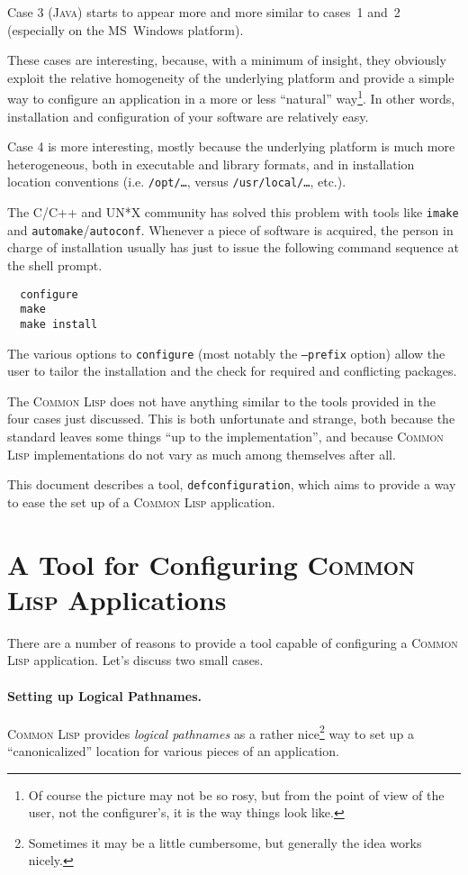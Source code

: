 \documentclass[a4paper]{article}
\newcommand{\CL}{\textsc{Common Lisp}}
\newcommand{\Java}{\textsc{Java}}
\newcommand{\defconfiguration}{\texttt{defconfiguration}}
\newcommand{\code}[1]{\texttt{#1}}
\begin{document}
Case 3 (\Java{}) starts to appear more and more similar to cases~1
and~2 (especially on the MS~Windows platform).

These cases are interesting, because, with a minimum of insight, they
obviously exploit the relative homogeneity of the underlying platform
and provide a simple way to configure an application in a more or
less ``natural'' way\footnote{Of course the picture may not be so
rosy, but from the point of view of the user, not the configurer's, it
is the way things look like.}. In other words, installation and
configuration of your software are relatively easy.

Case 4 is more interesting, mostly because the underlying platform is
much more heterogeneous, both in executable and library formats, and
in installation location conventions (i.e. \texttt{/opt/\ldots},
versus \texttt{/usr/local/\ldots}, etc.).

The C/C++ and UN*X community has solved this problem with tools like
\texttt{imake} and \texttt{automake}/\texttt{autoconf}.  Whenever a
piece of software is acquired, the person in charge of installation
usually has just to issue the following command sequence at the shell
prompt.
\begin{verbatim}
  configure
  make
  make install
\end{verbatim}
The various options to \code{configure} (most notably the
\code{--prefix} option) allow the user to tailor the installation and
the check for required and conflicting packages.

The \CL{} does not have anything similar to the tools provided in the
four cases just discussed.  This is both unfortunate and strange, both
because the standard leaves some things ``up to the implementation'',
and because \CL{} implementations do not vary as much among themselves
after all.

This document describes a tool, \defconfiguration{}, which aims to
provide a way to ease the set up of a \CL{} application.


\section{A Tool for Configuring \CL{} Applications}

There are a number of reasons to provide a tool capable of configuring
a \CL{} application. Let's discuss two small cases.

\paragraph{Setting up Logical Pathnames.} \CL{} provides \emph{logical
pathnames} \cite{pitman96:_common_lisp_hyper} as a rather
nice\footnote{Sometimes it may be a little cumbersome, but generally
the idea works nicely.}  way to set up a ``canonicalized'' location
for various pieces of an application.
\end{document}
